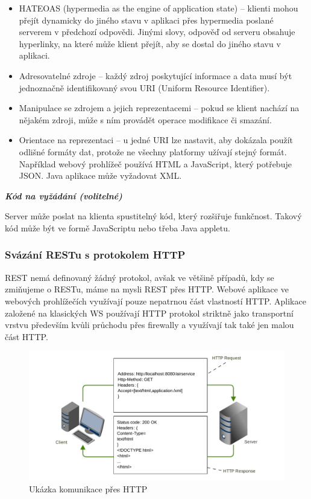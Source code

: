 \documentclass[11pt,twoside,a4paper]{book}
\begin{document}
\begin{itemize}
  \item HATEOAS (hypermedia as the engine of application state) – klienti mohou přejít
dynamicky do jiného stavu v aplikaci přes hypermedia poslané serverem v předchozí
odpovědi. Jinými slovy, odpověď od serveru obsahuje hyperlinky, na které může klient
přejít, aby se dostal do jiného stavu v aplikaci.
  \item Adresovatelné zdroje – každý zdroj poskytující informace a data musí být
jednoznačně identifikovaný svou URI (Uniform Resource Identifier).
\item Manipulace se zdrojem a jejich reprezentacemi – pokud se klient nachází na
nějakém zdroji, může s ním provádět operace modifikace či smazání.
\item Orientace na reprezentaci – u jedné URI lze nastavit, aby dokázala použít odlišné
formáty dat, protože ne všechny platformy užívají stejný formát. Například webový
prohlížeč používá HTML a JavaScript, který potřebuje JSON. Java aplikace může
vyžadovat XML.
\end{itemize}

\textbf{\textit{Kód na vyžádání (volitelné)}}

Server může poslat na klienta spustitelný kód, který rozšiřuje funkčnost. Takový kód může
být ve formě JavaScriptu nebo třeba Java appletu.

\subsubsection{Svázání RESTu s protokolem HTTP}

REST nemá definovaný žádný protokol, avšak ve většině případů, kdy se zmiňujeme o
RESTu, máme na mysli REST přes HTTP. Webové aplikace ve webových prohlížečích 
využívají pouze nepatrnou část vlastností HTTP. Aplikace založené na klasických WS
používají HTTP protokol striktně jako transportní vrstvu především kvůli průchodu přes
firewally a využívají tak také jen malou část HTTP.

\begin{figure}[h]
\begin{center}
\includegraphics[width=13cm]{images-pdf/http.pdf}
\caption{Ukázka komunikace přes HTTP}
\label{fig:logo}
\end{center}
\end{figure}
\end{document}
